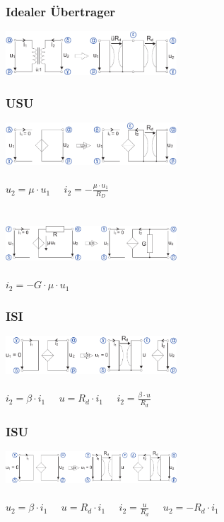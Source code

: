 \documentclass[a4paper,twocolumn,10pt]{article}
\begin{document}
\subsubsection*{Idealer Übertrager}
\includegraphics[width=0.48\textwidth]{Grafiken/KSA_Uebertrager}
\subsubsection*{USU}
\includegraphics[width=0.48\textwidth]{Grafiken/KSA_USU}\\\\
$u_2=\mu \cdot u_1\;\;\;\;\;i_2=-\frac{\mu \cdot u_1}{R_D}$\\\\\\
\includegraphics[width=0.48\textwidth]{Grafiken/KSA_USU2}\\\\
$i_2=-G\cdot \mu\cdot u_1$
\subsubsection*{ISI}
\includegraphics[width=0.48\textwidth]{Grafiken/KSA_ISI}\\\\
$i_2=\beta \cdot i_1\;\;\;\;\;u=R_d\cdot i_1\;\;\;\;\;i_2=\frac{\beta \cdot u}{R_d}$
\subsubsection*{ISU}
\includegraphics[width=0.48\textwidth]{Grafiken/KSA_ISU}\\\\
$u_2=\beta \cdot i_1\;\;\;\;\;u=R_d\cdot i_1\;\;\;\;\;i_2=\frac{u}{R_d}\;\;\;\;\;u_2=-R_d\cdot i_1$
\end{document}
